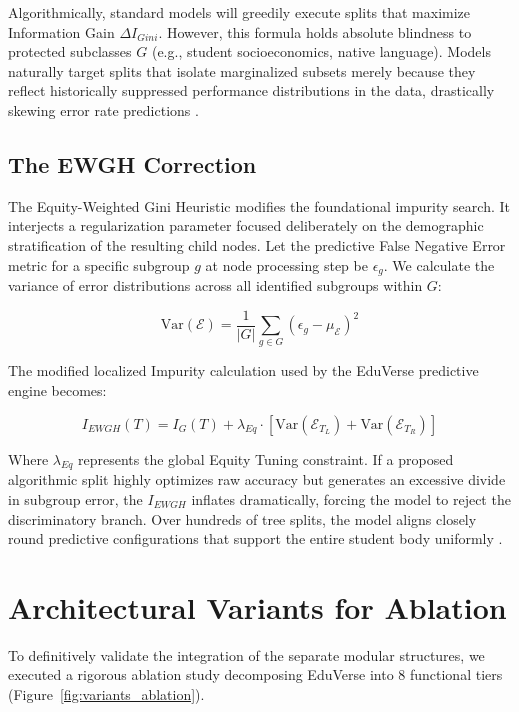 \documentclass[conference]{IEEEtran}
\begin{document}
Algorithmically, standard models will greedily execute splits that maximize Information Gain $\Delta I_{Gini}$. However, this formula holds absolute blindness to protected subclasses $G$ (e.g., student socioeconomics, native language). Models naturally target splits that isolate marginalized subsets merely because they reflect historically suppressed performance distributions in the data, drastically skewing error rate predictions \cite{taylor2024algorithmic}. 

\subsection{The EWGH Correction}

The Equity-Weighted Gini Heuristic modifies the foundational impurity search. It interjects a regularization parameter focused deliberately on the demographic stratification of the resulting child nodes. Let the predictive False Negative Error metric for a specific subgroup $g$ at node processing step be $\epsilon_{g}$. We calculate the variance of error distributions across all identified subgroups within $G$:

\begin{equation}
\text{Var}(\mathcal{E}) = \frac{1}{|G|} \sum_{g \in G} \left( \epsilon_g - \mu_\mathcal{E} \right)^2
\end{equation}

The modified localized Impurity calculation used by the EduVerse predictive engine becomes:

\begin{equation}
I_{EWGH}(T) = I_{G}(T) + \lambda_{Eq} \cdot \left[ \text{Var}(\mathcal{E}_{T_L}) + \text{Var}(\mathcal{E}_{T_R}) \right]
\end{equation}

Where $\lambda_{Eq}$ represents the global Equity Tuning constraint. If a proposed algorithmic split highly optimizes raw accuracy but generates an excessive divide in subgroup error, the $I_{EWGH}$ inflates dramatically, forcing the model to reject the discriminatory branch. Over hundreds of tree splits, the model aligns closely round predictive configurations that support the entire student body uniformly \cite{davis2023equity}.

\section{Architectural Variants for Ablation}

To definitively validate the integration of the separate modular structures, we executed a rigorous ablation study decomposing EduVerse into 8 functional tiers (Figure~\ref{fig:variants_ablation}). 
\end{document}
